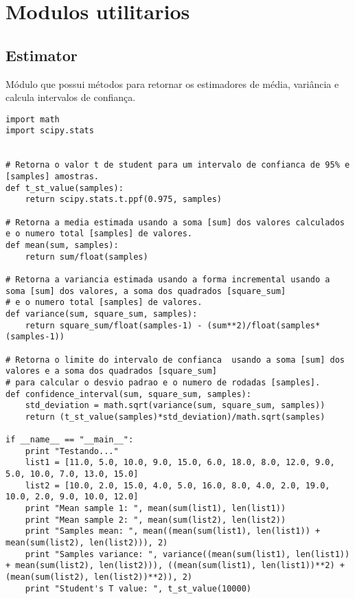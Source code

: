 \section{Modulos utilitarios}

\subsection{Estimator}
Módulo que possui métodos para retornar os estimadores de média, variância e calcula intervalos de confiança.\\

\begin{lstlisting}
import math
import scipy.stats


# Retorna o valor t de student para um intervalo de confianca de 95% e [samples] amostras.
def t_st_value(samples):
    return scipy.stats.t.ppf(0.975, samples)

# Retorna a media estimada usando a soma [sum] dos valores calculados e o numero total [samples] de valores.
def mean(sum, samples):
    return sum/float(samples)

# Retorna a variancia estimada usando a forma incremental usando a soma [sum] dos valores, a soma dos quadrados [square_sum]
# e o numero total [samples] de valores.
def variance(sum, square_sum, samples):
    return square_sum/float(samples-1) - (sum**2)/float(samples*(samples-1))

# Retorna o limite do intervalo de confianca  usando a soma [sum] dos valores e a soma dos quadrados [square_sum]
# para calcular o desvio padrao e o numero de rodadas [samples].
def confidence_interval(sum, square_sum, samples):
    std_deviation = math.sqrt(variance(sum, square_sum, samples))
    return (t_st_value(samples)*std_deviation)/math.sqrt(samples)

if __name__ == "__main__":
    print "Testando..."
    list1 = [11.0, 5.0, 10.0, 9.0, 15.0, 6.0, 18.0, 8.0, 12.0, 9.0, 5.0, 10.0, 7.0, 13.0, 15.0]
    list2 = [10.0, 2.0, 15.0, 4.0, 5.0, 16.0, 8.0, 4.0, 2.0, 19.0, 10.0, 2.0, 9.0, 10.0, 12.0]
    print "Mean sample 1: ", mean(sum(list1), len(list1))
    print "Mean sample 2: ", mean(sum(list2), len(list2))
    print "Samples mean: ", mean((mean(sum(list1), len(list1)) + mean(sum(list2), len(list2))), 2)
    print "Samples variance: ", variance((mean(sum(list1), len(list1)) + mean(sum(list2), len(list2))), ((mean(sum(list1), len(list1))**2) + (mean(sum(list2), len(list2))**2)), 2)
    print "Student's T value: ", t_st_value(10000)
\end{lstlisting}

